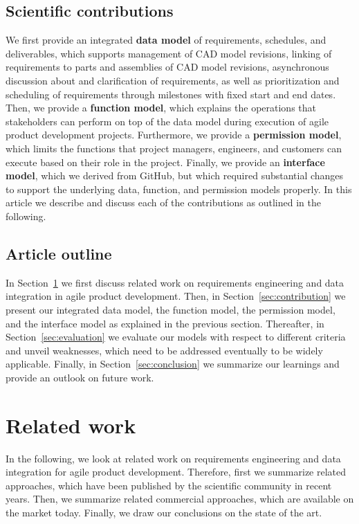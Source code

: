     \subsection*{Scientific contributions}
    We first provide an integrated \textbf{data model} of requirements, schedules, and deliverables, which supports management of CAD model revisions, linking of requirements to parts and assemblies of CAD model revisions, asynchronous discussion about and clarification of requirements, as well as prioritization and scheduling of requirements through milestones with fixed start and end dates.
    Then, we provide a \textbf{function model}, which explains the operations that stakeholders can perform on top of the data model during execution of agile product development projects.
    Furthermore, we provide a \textbf{permission model}, which limits the functions that project managers, engineers, and customers can execute based on their role in the project.
    Finally, we provide an \textbf{interface model}, which we derived from GitHub, but which required substantial changes to support the underlying data, function, and permission models properly.
    In this article we describe and discuss each of the contributions as outlined in the following.

    \subsection*{Article outline}
    In Section~\ref{sec:differentiation} we first discuss related work on requirements engineering and data integration in agile product development.
    Then, in Section~\ref{sec:contribution} we present our integrated data model, the function model, the permission model, and the interface model as explained in the previous section.
    Thereafter, in Section~\ref{sec:evaluation} we evaluate our models with respect to different criteria and unveil weaknesses, which need to be addressed eventually to be widely applicable.
    Finally, in Section~\ref{sec:conclusion} we summarize our learnings and provide an outlook on future work.
    
    \section{Related work}
    \label{sec:differentiation}
    In the following, we look at related work on requirements engineering and data integration for agile product development. Therefore, first we summarize related approaches, which have been published by the scientific community in recent years. Then, we summarize related commercial approaches, which are available on the market today. Finally, we draw our conclusions on the state of the art.

